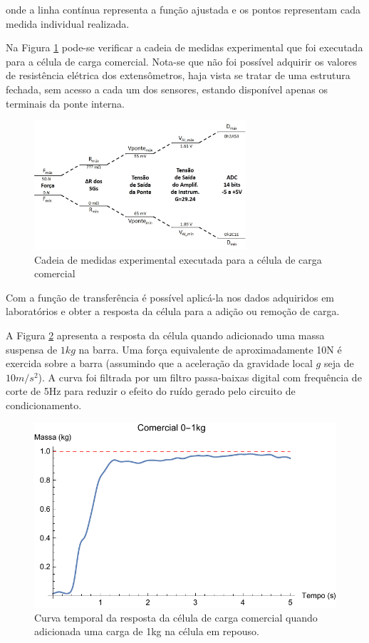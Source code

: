\documentclass[a4paper]{instrumentacao}
\begin{document}
\noindent onde a linha contínua representa a função ajustada e os pontos representam cada medida individual realizada.

Na Figura \ref{fig:celula-comercial-cadeia-medidas-experimental} pode-se verificar a cadeia de medidas experimental que foi executada para a célula de carga comercial. Nota-se que não foi possível adquirir os valores de resistência elétrica dos extensômetros, haja vista se tratar de uma estrutura fechada, sem acesso a cada um dos sensores, estando disponível apenas os terminais da ponte interna.

\begin{figure}[H]
\center
\includegraphics[width=0.7\textwidth]{CadeiaMedidasExperimental_CelulaComercial.jpg}
\caption{Cadeia de medidas experimental executada para a célula de carga comercial}
\label{fig:celula-comercial-cadeia-medidas-experimental}
\end{figure}


Com a função de transferência é possível aplicá-la nos dados adquiridos em laboratórios e obter a resposta da célula para a adição ou remoção de carga.

A Figura \ref{fig:celula-comercial-resultado-0-1kg} apresenta a resposta da célula quando adicionado uma massa suspensa de $1 kg$ na barra. Uma força equivalente de aproximadamente 10N é exercida sobre a barra (assumindo que a aceleração da gravidade local $g$ seja de $10 m/s^2$). A curva foi filtrada por um filtro passa-baixas digital com frequência de corte de 5Hz para reduzir o efeito do ruído gerado pelo circuito de condicionamento.

\begin{figure}[H]
\center
\includegraphics[width=\textwidth]{Comercial_0-1kg.pdf}
\caption{Curva temporal da resposta da célula de carga comercial quando adicionada uma carga de 1kg na célula em repouso.}
\label{fig:celula-comercial-resultado-0-1kg}
\end{figure}
\end{document}
